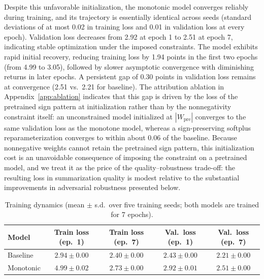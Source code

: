 \documentclass{article}
\theoremstyle{plain}
\theoremstyle{definition}
\theoremstyle{remark}
\begin{document}
Despite this unfavorable initialization, the monotonic model converges reliably during training, and its trajectory is essentially identical across seeds (standard deviations of at most 0.02 in training loss and 0.01 in validation loss at every epoch). Validation loss decreases from 2.92 at epoch 1 to 2.51 at epoch 7, indicating stable optimization under the imposed constraints. The model exhibits rapid initial recovery, reducing training loss by 1.94 points in the first two epochs (from 4.99 to 3.05), followed by slower asymptotic convergence with diminishing returns in later epochs. A persistent gap of 0.30 points in validation loss remains at convergence (2.51 vs.\ 2.21 for baseline). The attribution ablation in Appendix~\ref{app:ablation} indicates that this gap is driven by the loss of the pretrained sign pattern at initialization rather than by the nonnegativity constraint itself: an unconstrained model initialized at $|W_{\mathrm{pre}}|$ converges to the same validation loss as the monotone model, whereas a sign-preserving softplus reparameterization converges to within about 0.06 of the baseline. Because nonnegative weights cannot retain the pretrained sign pattern, this
initialization cost is an unavoidable consequence of imposing the constraint on a
pretrained model, and we treat it as the price of the quality--robustness trade-off:
the resulting loss in summarization quality is modest relative to the substantial
improvements in adversarial robustness presented below.


\begin{table}[t]
\caption{Training dynamics (mean $\pm$ s.d.\ over five training seeds; both models are trained for 7 epochs).}
\label{tab:training}
\vskip 0.1in
\begin{center}
\begin{small}
\begin{tabular}{lcccc}
\toprule
Model & Train loss (ep.\ 1) & Train loss (ep.\ 7) & Val.\ loss (ep.\ 1) & Val.\ loss (ep.\ 7) \\
\midrule
Baseline  & $2.94 \pm 0.00$ & $2.40 \pm 0.00$ & $2.43 \pm 0.00$ & $2.21 \pm 0.00$ \\
Monotonic & $4.99 \pm 0.02$ & $2.73 \pm 0.00$ & $2.92 \pm 0.01$ & $2.51 \pm 0.00$ \\
\bottomrule
\end{tabular}
\end{small}
\end{center}
\vskip -0.1in
\end{table}
\end{document}
